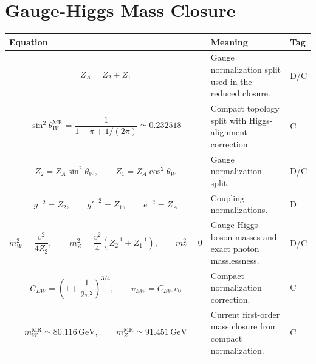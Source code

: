 \documentclass[11pt]{article}
\newcommand{\MR}{\mathrm{MR}}
\begin{document}
\section{Gauge-Higgs Mass Closure}
\begin{longtable}{>{\raggedright\arraybackslash}p{} >{\raggedright\arraybackslash}p{} >{\centering\arraybackslash}p{}}
\toprule
\textbf{Equation} & \textbf{Meaning} & \textbf{Tag} \\
\midrule
\endhead

\begin{equation}
Z_A=Z_2+Z_1
\end{equation}
& Gauge normalization split used in the reduced closure. & D/C \\

\begin{equation}
\sin^2\theta_W^{\MR}=\frac{1}{1+\pi+1/(2\pi)}\simeq0.232518
\end{equation}
& Compact topology split with Higgs-alignment correction. & C \\

\begin{equation}
Z_2=Z_A\sin^2\theta_W,
\qquad Z_1=Z_A\cos^2\theta_W
\end{equation}
& Gauge normalization split. & D/C \\

\begin{equation}
g^{-2}=Z_2,
\qquad g'^{-2}=Z_1,
\qquad e^{-2}=Z_A
\end{equation}
& Coupling normalizations. & D \\

\begin{equation}
m_W^2=\frac{v^2}{4Z_2},
\qquad
m_Z^2=\frac{v^2}{4}\left(Z_2^{-1}+Z_1^{-1}\right),
\qquad m_\gamma^2=0
\end{equation}
& Gauge-Higgs boson masses and exact photon masslessness. & D/C \\

\begin{equation}
C_{EW}=\left(1+\frac{1}{2\pi^2}\right)^{3/4},
\qquad v_{EW}=C_{EW}v_0
\end{equation}
& Compact normalization correction. & C \\

\begin{equation}
m_W^{\MR}\simeq80.116\,\mathrm{GeV},
\qquad
m_Z^{\MR}\simeq91.451\,\mathrm{GeV}
\end{equation}
& Current first-order mass closure from compact normalization. & C \\

\bottomrule
\end{longtable}
\end{document}
